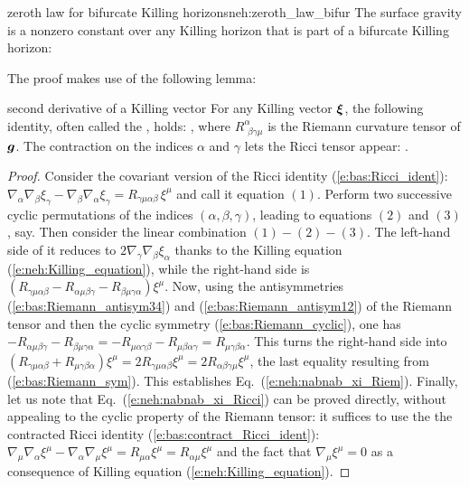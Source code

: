 \begin{tprop}{zeroth law for bifurcate Killing horizons}{neh:zeroth_law_bifur}
The surface gravity is a nonzero constant over any Killing horizon that is part of a
bifurcate Killing horizon:
\be
\ee
\end{tprop}
The proof makes use of the following lemma:

\begin{tlemma}{second derivative of a Killing vector}{}
For any Killing vector $\bm{\xi}$, the following identity, often called the
, holds:
\be \label{e:neh:nabnab_xi_Riem}
    ,
\ee
where $R^\alpha_{\ \, \beta\gamma\mu}$ is the Riemann curvature tensor of $\bm{g}$.
The contraction on the indices $\alpha$ and $\gamma$ lets the Ricci tensor appear:
\be \label{e:neh:nabnab_xi_Ricci}
     .
\ee
\end{tlemma}

\begin{proof}
Consider
the covariant version of the Ricci identity (\ref{e:bas:Ricci_ident}):
$\nabla_\alpha\nabla_\beta \xi_\gamma - \nabla_\beta\nabla_\alpha \xi_\gamma
        = R_{\gamma\mu \alpha\beta} \, \xi^\mu$ and call it equation $(1)$.
Perform two successive cyclic permutations of the indices $(\alpha,\beta,\gamma)$, leading
to equations $(2)$ and $(3)$, say. Then consider the linear combination $(1) - (2) - (3)$.
The left-hand side of it reduces to $2 \nabla_\gamma \nabla_\beta \xi_\alpha$
thanks to the Killing equation (\ref{e:neh:Killing_equation}), while the
right-hand side is $(R_{\gamma\mu \alpha\beta} - R_{\alpha\mu\beta\gamma} - R_{\beta\mu\gamma\alpha})\xi^\mu$.
Now, using the antisymmetries (\ref{e:bas:Riemann_antisym34}) and (\ref{e:bas:Riemann_antisym12}) of the Riemann tensor and then the cyclic symmetry (\ref{e:bas:Riemann_cyclic}), one has
$- R_{\alpha\mu\beta\gamma} - R_{\beta\mu\gamma\alpha} = - R_{\mu\alpha\gamma\beta} - R_{\mu\beta\alpha\gamma}
= R_{\mu\gamma\beta\alpha}$. This turns the right-hand side into $(R_{\gamma\mu \alpha\beta} + R_{\mu\gamma\beta\alpha})\xi^\mu = 2 R_{\gamma\mu \alpha\beta} \xi^\mu = 2 R_{\alpha\beta\gamma\mu} \xi^\mu$, the last equality resulting from
(\ref{e:bas:Riemann_sym}). This establishes Eq.~(\ref{e:neh:nabnab_xi_Riem}).
Finally, let us note that Eq.~(\ref{e:neh:nabnab_xi_Ricci}) can be proved directly, without appealing
to the cyclic property of the Riemann tensor: it suffices to use the the contracted Ricci identity (\ref{e:bas:contract_Ricci_ident}):  $\nabla_\mu \nabla_\alpha \xi^\mu - \nabla_\alpha \nabla_\mu \xi^\mu = R_{\mu\alpha} \xi^\mu = R_{\alpha\mu} \xi^\mu$ and the fact that $\nabla_\mu \xi^\mu = 0$ as a consequence
of Killing equation (\ref{e:neh:Killing_equation}).
\end{proof}


